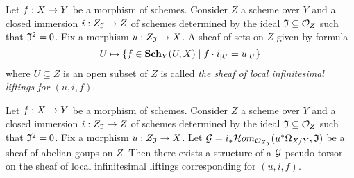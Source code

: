 \begin{definition}
Let $f:X\rightarrow Y$ be a morphism of schemes. Consider $Z$ a scheme over $Y$ and a closed immersion $i:Z_{\mathfrak{I}}\rightarrow Z$ of schemes determined by the ideal $\mathfrak{I}\subseteq {\mathcal O}_Z$ such that $\mathfrak{I}^2 = 0$. Fix a morphism $u:Z_{\mathfrak{I}}\rightarrow X$. A sheaf of sets on $Z$ given by formula
$$U\mapsto \{f\in \mathbf{Sch}_Y(U,X) \mid f\cdot i_{\mid U}=u_{\mid U}\}$$
where $U\subseteq Z$ is an open subset of $Z$ is called \textit{the sheaf of local infinitesimal liftings for $(u,i,f)$}.
\end{definition}

\begin{theorem}\label{theorem:sheaf_of_infinitesimal_liftings_is_canonically_pseudo_torsor}
Let $f:X\rightarrow Y$ be a morphism of schemes. Consider $Z$ a scheme over $Y$ and a closed immersion $i:Z_{\mathfrak{I}}\rightarrow Z$ of schemes determined by the ideal $\mathfrak{I}\subseteq {\mathcal O}_Z$ such that $\mathfrak{I}^2 = 0$. Fix a morphism $u:Z_{\mathfrak{I}}\rightarrow X$. Let ${\mathcal G} = i_* {\mathcal H}om_{{\mathcal O}_{Z_{\mathfrak{I}}}}(u^*\Omega_{X/Y},\mathfrak{I})$ be a sheaf of abelian goups on $Z$. Then there exists a structure of a ${\mathcal G}$-pseudo-torsor on the sheaf of local infinitesimal liftings corresponding for $(u,i,f)$.  
\end{theorem}
